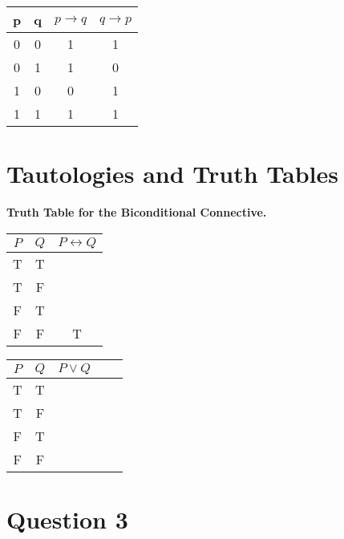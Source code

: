 \documentclass[]{report}
\begin{document}
\begin{center}
	\begin{tabular}{|c|c|c|c|}
		\hline
		p & q & $p \rightarrow q$ & $q \rightarrow p$ \\
		\hline
		0 & 0 & 1& 1 \\
		0 & 1 & 1 & 0 \\
		1 & 0 & 0 & 1 \\
		1 & 1 & 1 & 1 \\
		\hline
	\end{tabular}
\end{center}

\section{Tautologies and Truth Tables}
\textbf{Truth Table for the Biconditional Connective.} \bigskip
\begin{center}
	\begin{tabular}{|c|c|c|}
		\hline $P$  & $Q$ & $P \leftrightarrow Q$ \\ \hline
		\hline T & T &   \\ 
		\hline T & F &    \\ 
		\hline F & T &    \\ 
		\hline \phantom{sp}F \phantom{sp} & \phantom{sp}F \phantom{sp} & \phantom{sp}T \phantom{sp} \\
		\hline 
	\end{tabular} 
\end{center}

\begin{tabular}{|c|c|c|c|c|}
	\hline $P$ & $Q$ & $P \vee Q$ &  &  \\ \hline
	\hline T & T &  &  &  \\ 
	\hline T & F &  &  &  \\ 
	\hline F & T &  &  &  \\ 
	\hline \phantom{sp}F \phantom{sp} & \phantom{sp}F \phantom{sp} & \phantom{spacespa} & \phantom{spacespa}  & \phantom{spacespa} \\ 
	
	\hline 
\end{tabular} 

\newpage



\section*{Question 3}
\end{document}
